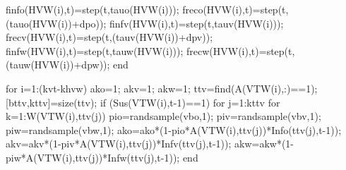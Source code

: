                                                 finfo(HVW(i),t)=step(t,tauo(HVW(i))); %
                                                freco(HVW(i),t)=step(t,(tauo(HVW(i))+dpo)); %
                                                finfv(HVW(i),t)=step(t,tauv(HVW(i))); %
                                                frecv(HVW(i),t)=step(t,(tauv(HVW(i))+dpv)); %
                                                finfw(HVW(i),t)=step(t,tauw(HVW(i))); %
                                                frecw(HVW(i),t)=step(t,(tauw(HVW(i))+dpw)); %
                                    end
                                    
                                    for i=1:(kvt-khvw)       
                                          ako=1;
                                          akv=1;
                                          akw=1;
                                          ttv=find(A(VTW(i),:)==1);    
                                          [bttv,kttv]=size(ttv);
                                          if (Sus(VTW(i),t-1)==1)
                                                    for j=1:kttv                                                                                                  
                                                          for k=1:W(VTW(i),ttv(j))                                                     
                                                                pio=randsample(vbo,1);
                                                                piv=randsample(vbv,1);
                                                                piw=randsample(vbw,1);
                                                                ako=ako*(1-pio*A(VTW(i),ttv(j))*Info(ttv(j),t-1));
                                                                akv=akv*(1-piv*A(VTW(i),ttv(j))*Infv(ttv(j),t-1));
                                                                akw=akw*(1-piw*A(VTW(i),ttv(j))*Infw(ttv(j),t-1));                                                                 
                                                          end
                                                          

